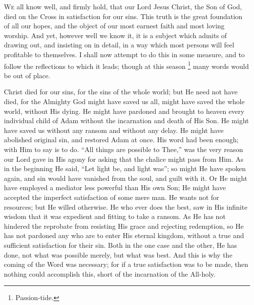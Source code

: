 
W\textsc{e} all know well, and firmly hold, that our Lord Jesus Christ, the
Son of God, died on the Cross in satisfaction for our sins. This truth
is the great foundation of all our hopes, and the object of our most
earnest faith and most loving worship. And yet, however well we know
it, it is a subject which admits of drawing out, and insisting on in
detail, in a way which most persons will feel profitable to
themselves. I shall now attempt to do this in some measure, and to
follow the reflections to which it leads; though at this season \footnote{Passion-tide.} many words would be out of place.

Christ died for our sins, for the sins of the whole world; but He
need not have died, for the Almighty God might have saved us all,
might have saved the whole world, without His dying. He might have
pardoned and brought to heaven every individual child of Adam without
the incarnation and death of His Son. He might have saved us without
any ransom and without any delay. He might have abolished original
sin, and restored Adam at once. His word had been enough; with Him to
say is to do. ``All things are possible to Thee,'' was the
very reason our Lord gave in His agony for asking that the chalice
might pass from Him. As in the beginning He said, ``Let light be,
and light was''; so might He have spoken again, and sin would have
vanished from the soul, and guilt with it. Or He might have employed a
mediator less powerful than His own Son; He might have accepted the
imperfect satisfaction of some mere man. He wants not for resources;
but He willed otherwise. He who ever does the best, saw in His
infinite wisdom that it was expedient and fitting to take a ransom. As
He has not hindered the reprobate from resisting His grace and
rejecting redemption, so He has not pardoned any who are to enter His
eternal kingdom, without a true and sufficient satisfaction for their
sin. Both in the one case and the other, He has done, not what was
possible merely, but what was best. And this is why the coming of the
Word was necessary; for if a true satisfaction was to be made, then
nothing could accomplish this, short of the incarnation of the
All-holy.

